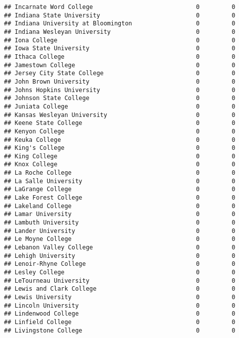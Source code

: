 \documentclass[
]{article}
\begin{document}
\begin{verbatim}
## Incarnate Word College                             0         0
## Indiana State University                           0         0
## Indiana University at Bloomington                  0         0
## Indiana Wesleyan University                        0         0
## Iona College                                       0         0
## Iowa State University                              0         0
## Ithaca College                                     0         0
## Jamestown College                                  0         0
## Jersey City State College                          0         0
## John Brown University                              0         0
## Johns Hopkins University                           0         0
## Johnson State College                              0         0
## Juniata College                                    0         0
## Kansas Wesleyan University                         0         0
## Keene State College                                0         0
## Kenyon College                                     0         0
## Keuka College                                      0         0
## King's College                                     0         0
## King College                                       0         0
## Knox College                                       0         0
## La Roche College                                   0         0
## La Salle University                                0         0
## LaGrange College                                   0         0
## Lake Forest College                                0         0
## Lakeland College                                   0         0
## Lamar University                                   0         0
## Lambuth University                                 0         0
## Lander University                                  0         0
## Le Moyne College                                   0         0
## Lebanon Valley College                             0         0
## Lehigh University                                  0         0
## Lenoir-Rhyne College                               0         0
## Lesley College                                     0         0
## LeTourneau University                              0         0
## Lewis and Clark College                            0         0
## Lewis University                                   0         0
## Lincoln University                                 0         0
## Lindenwood College                                 0         0
## Linfield College                                   0         0
## Livingstone College                                0         0

\end{verbatim}
\end{document}
